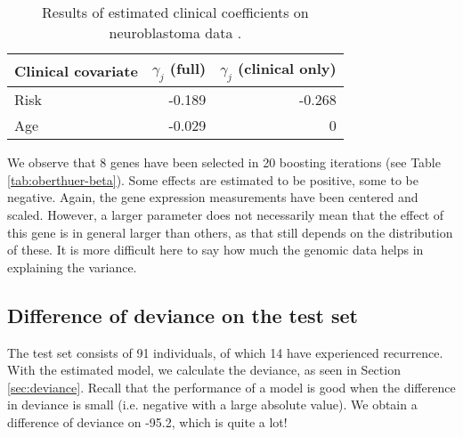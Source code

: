 \begin{table}
\caption{Results of estimated clinical coefficients on neuroblastoma data \citep{oberthuer-data}.}
\label{tab:oberthuer-gamma}
\centering
\begin{tabular}{lrr}
\toprule
Clinical covariate & $\gamma_j$ (full) & $\gamma_j$ (clinical only)\\
\hline
Risk      &  -0.189  &  -0.268\\
Age       &  -0.029  &       0 \\
\bottomrule
\end{tabular}
\end{table}

We observe that 8 genes have been selected in 20 boosting iterations (see Table \ref{tab:oberthuer-beta}).
Some effects are estimated to be positive, some to be negative.
Again, the gene expression measurements have been centered and scaled.
However, a larger parameter does not necessarily mean that the effect of this gene is in general larger than others, as that still depends on the distribution of these.
It is more difficult here to say how much the genomic data helps in explaining the variance.


\subsection{Difference of deviance on the test set}
The test set consists of 91 individuals, of which 14 have experienced recurrence.
With the estimated model, we calculate the deviance, as seen in Section \ref{sec:deviance}.
Recall that the performance of a model is good when the difference in deviance is small (i.e. negative with a large absolute value).
We obtain a difference of deviance on -95.2, which is quite a lot!

